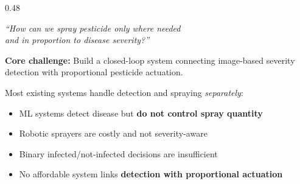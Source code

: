 \documentclass[final,t]{beamer}
\begin{document}
\begin{frame}[t]{}
\begin{columns}[T]
\begin{column}{0.48\textwidth}
\begin{posterbox}[title=1~~Motivation \& Problem Statement]
\vspace{0.3em}
\begin{resultbox}
\centering\large
\textit{``How can we spray pesticide only where needed\\
and in proportion to disease severity?''}
\end{resultbox}
\vspace{0.3em}

\textbf{Core challenge:} Build a closed-loop system connecting image-based
severity detection with proportional pesticide actuation.

\vspace{0.4em}
\begin{center}
\end{center}
\end{posterbox}

\vspace{0.4cm}

\begin{posterbox}[title=2~~Research Gap]
\justifying
Most existing systems handle detection and spraying \textit{separately}:

\vspace{0.3em}
\begin{itemize}
  \item ML systems detect disease but \textbf{do not control spray quantity}
  \item Robotic sprayers are costly and not severity-aware
  \item Binary infected/not-infected decisions are insufficient
  \item No affordable system links \textbf{detection with proportional actuation}
\end{itemize}


\end{posterbox}
\end{column}
\end{columns}
\end{frame}
\end{document}
